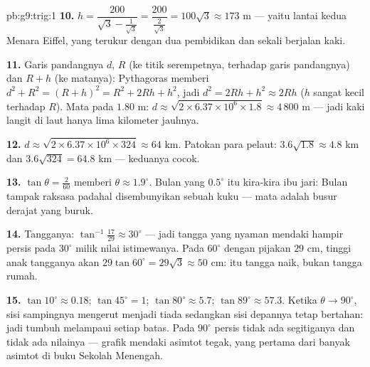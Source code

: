 \begin{solution}{pb:g9:trig:1}
\textbf{10.} $h = \dfrac{200}{\sqrt3 - \frac{1}{\sqrt3}}
= \dfrac{200}{\frac{2}{\sqrt3}} = 100\sqrt3 \approx 173$ m ---
yaitu lantai kedua Menara Eiffel, yang terukur dengan dua pembidikan
dan sekali berjalan kaki.

\textbf{11.} Garis pandangnya $d$,  $R$ (ke titik
serempetnya,  terhadap garis pandangnya) dan $R + h$ (ke
matanya): Pythagoras memberi $d^2 + R^2 = (R + h)^2 = R^2 + 2Rh + h^2$,
jadi $d^2 = 2Rh + h^2 \approx 2Rh$ ($h$ sangat kecil terhadap $R$).
Mata pada $1.80$ m:
$d \approx \sqrt{2 \times 6.37 \times 10^6 \times 1.8}
\approx 4\,800$ m --- jadi kaki langit di laut hanya lima kilometer
jauhnya.

\textbf{12.} $d \approx \sqrt{2 \times 6.37 \times 10^6 \times
324} \approx 64$ km. Patokan para pelaut: $3.6\sqrt{1.8} \approx
4.8$ km dan $3.6\sqrt{324} = 64.8$ km --- keduanya cocok.

\textbf{13.} $\tan\theta = \frac{2}{60}$ memberi $\theta \approx
1.9^\circ$. Bulan yang $0.5^\circ$ itu kira-kira \emph{}
ibu jari: Bulan tampak raksasa padahal disembunyikan sebuah kuku
--- mata adalah busur derajat yang buruk.

\textbf{14.} Tangganya: $\tan^{-1}\frac{17}{29} \approx 30^\circ$
--- jadi tangga yang nyaman mendaki hampir persis pada
$30^\circ$ milik nilai istimewanya. Pada $60^\circ$ dengan pijakan
$29$ cm, tinggi anak tangganya akan $29\tan 60^\circ = 29\sqrt3 \approx
50$ cm: itu tangga naik, bukan tangga rumah.

\textbf{15.} $\tan 10^\circ \approx 0.18$;
$\tan 45^\circ = 1$; $\tan 80^\circ \approx 5.7$;
$\tan 89^\circ \approx 57.3$. Ketika $\theta \to 90^\circ$, sisi
sampingnya mengerut menjadi tiada sedangkan sisi
depannya tetap bertahan:
jadi  tumbuh melampaui setiap batas. Pada $90^\circ$
persis tidak ada segitiganya dan tidak ada nilainya --- grafik 
mendaki asimtot tegak, yang pertama dari banyak asimtot di buku
Sekolah Menengah.

\end{solution}
